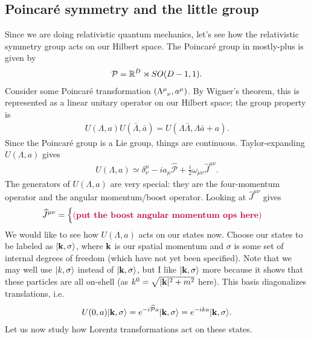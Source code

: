 \documentclass[11pt]{article}
\begin{document}
\subsection{Poincaré symmetry and the little group}
Since we are doing relativistic quantum mechanics, let's
see how the relativistic symmetry group acts on our Hilbert space.
The Poincaré group in mostly-plus is given by
\begin{align*}
    \mathcal{P} = \mathbb{R}^D \rtimes SO(D - 1, 1).
\end{align*}
Consider some Poincaré transformation $(\Lambda\indices{^\mu_\nu}, a^\mu)$.
By Wigner's theorem, this is represented as a linear unitary operator on
our Hilbert space; the group property is
\begin{align*}
    U(\Lambda, a) U(\bar{\Lambda}, \bar{a}) = U(\Lambda \bar{\Lambda}, \Lambda \bar{a} + a).
\end{align*}
Since the Poincaré group is a Lie group, things are continuous.
Taylor-expanding $U(\Lambda, a)$ gives
\begin{align*}
    U(\Lambda, a) \simeq \delta^{\mu}_{\nu} - i a_\mu \widehat{\mathcal{P}} + \frac{i}{2} \omega_{\mu \nu} \widehat{J}^{\mu \nu}.
\end{align*}
The generators of $U(\Lambda, a)$ are very special: they are the
four-momentum operator and the angular momentum/boost operator.
Looking at $\widehat{J}^{\mu \nu}$ gives
\begin{align*}
    \widehat{J}^{\mu \nu} = \begin{cases}
        \color{purple} (\textbf{put the boost angular momentum ops here}) \color{black}
    \end{cases}
\end{align*}
We would like to see how $U(\Lambda, a)$ acts on our states now.
Choose our states to be labeled as $\lvert\mathbf{k}, \sigma\rangle$, where
$\mathbf{k}$ is our spatial momentum and $\sigma$ is some set of internal
degrees of freedom (which have not yet been specified). Note that
we may well use $\lvert k, \sigma\rangle$ instead of $\lvert\mathbf{k}, \sigma\rangle$,
but I like $\lvert\mathbf{k}, \sigma\rangle$ more because it shows that these
particles are all on-shell (as $k^0 = \sqrt{|\mathbf{k}|^2 + m^2}$ here).
This basis diagonalizes translations, i.e.
\begin{align*}
    U(0, a) \lvert\mathbf{k}, \sigma\rangle = e^{- i \widehat{\mathcal{P}} a} \lvert\mathbf{k}, \sigma\rangle = e^{-i k a} \lvert\mathbf{k}, \sigma\rangle.
\end{align*}
Let us now study how Lorentz transformations act on these states.
\end{document}
